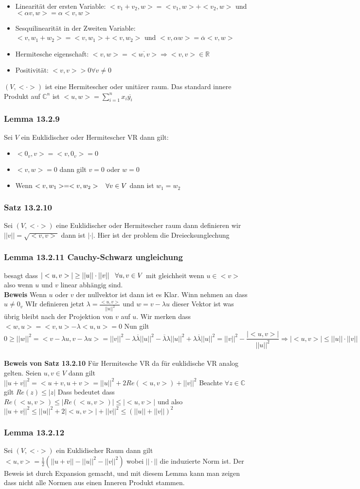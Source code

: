 \documentclass{article}
\newcommand{\smspc}{\hspace{0.3cm}}
\newcommand{\satz}[1]{\subsubsection*{Satz {#1}}}
\newcommand{\beweis}{\\\textbf{Beweis }}
\newcommand{\lemma}[1]{\subsubsection*{Lemma {#1}}}
\begin{document}
\begin{itemize}
  \item{Linearität der ersten Variable: $<v_1+v_2,w>=<v_1,w>+<v_2,w>$ und $<\alpha v,w>=\alpha<v,w>$} 
  \item{Sesquilinearität in der Zweiten Variable: $<v,w_1+w_2>=<v,w_1>+<v,w_2>$ und $<v,\alpha w>=\overline{\alpha}<v,w>$}
  \item{Hermitesche eigenschaft: $<v,w>=\overline{<w,v>}\Rightarrow <v,v>\in \mathbb{R}$}
  \item{Positivität: $<v,v>>0\forall v\neq 0$}
\end{itemize}
$(V,<\cdot>)$ ist eine Hermitescher oder unitärer raum. Das standard innere Produkt auf $\mathbb{C}^n$ ist $<u,w>=\sum_{i=1}^nx_i\overline{y_i}$
\lemma{13.2.9} Sei $V$ ein  Euklidischer oder Hermitescher VR dann gilt:
\begin{itemize}
  \item{$<0_v,v>=<v,0_v>=0$}
  \item{$<v,w>=0$ dann gilt $v=0$ oder $w=0$}
  \item{Wenn $<v,w_1>=<v,w_2>\smspc\forall v\in V$ dann ist $w_1=w_2$}
\end{itemize}
\satz{13.2.10} Sei $(V,<\cdot>)$ eine Euklidischer oder Hermitescher raum dann definieren wir $||v||=\sqrt{<v,v>}$ dann ist $|\cdot|$. Hier ist der problem die Dreiecksunglechung
\lemma{13.2.11 Cauchy-Schwarz ungleichung} besagt dass $|<u,v>|\ge||u||\cdot||v||\smspc\forall u,v\in V$ mit gleichheit wenn $u\in<v>$ also wenn $u$ und $v$ linear abhängig sind.
\beweis Wenn $u$ oder $v$ der nullvektor ist dann ist es Klar. Winn nehmen an dass $u\neq 0_v$ WIr definieren jetzt $\lambda=\frac{<u,v>}{||u||^2}$ und $w=v-\lambda u$ dieser Vektor ist was übrig bleibt nach der Projektion von $v$ auf $u$. Wir merken dass $<w,u>=<v,u>-\lambda<u,u>=0$
Nun gilt \[0\ge||w||^2=<v-\lambda u,v-\lambda u>=||v||^2-\lambda\overline{\lambda}||u||^2-\overline{\lambda}\lambda||u||^2+\lambda\overline{\lambda}||u||^2=||v||^2-\frac{|<u,v>|}{||u||^2}\Rightarrow |<u,v>|\le||u||\cdot||v||\]
\beweis \textbf{von Satz 13.2.10} Für Hermitesche VR da für euklidische VR analog gelten. Seien $u,v\in V$ dann gilt $||u+v||^2=<u+v,u+v>=||u||^2+2Re(<u,v>)+||v||^2$ Beachte $\forall z \in \mathbb{C}$ gilt $Re(z)\le |z|$
Dass bedeutet dass $Re(<u,v>)\le|Re(<u,v>)|\le |<u,v>|$ und also $||u+v||^2\le||u||^2+2|<u,v>|+||v||^2\le(||u||+||v||)^2$
\lemma{13.2.12} Sei $(V,<\cdot>)$ ein Euklidischer Raum dann gilt $<u,v>=\frac{1}{2}(||u+v||-||u||^2-||v||^2)$ wobei $||\cdot||$ die induzierte Norm ist. Der Beweis ist durch Expansion gemacht, und mit diesem Lemma kann man zeigen dass nicht alle Normen aus einen Inneren Produkt stammen.
\end{document}
